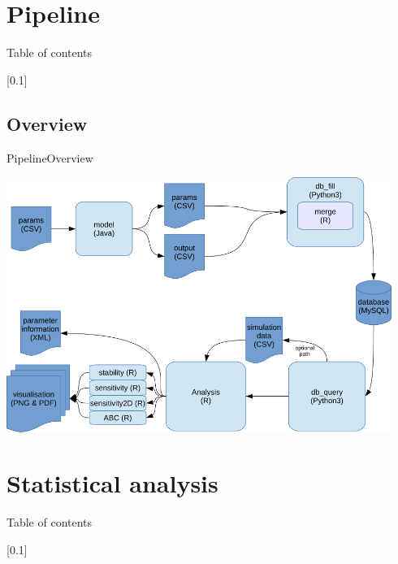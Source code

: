 \documentclass[10pt,aspectratio=43]{beamer}
\begin{document}
\section{Pipeline}
\begin{frame}{}{Table of contents}
\tableofcontents[currentsection, subsectionstyle=show/show/hide]
\end{frame}

[0.1]{}{}{}
\subsection{Overview}
\begin{frame}{Pipeline}{Overview}
\begin{center}
  \includegraphics[width=0.94\textwidth]{../data/workflow-2.png}
\end{center}
\end{frame}


\section{Statistical analysis}
\begin{frame}{}{Table of contents}
\tableofcontents[currentsection, subsectionstyle=show/show/hide]
\end{frame}

[0.1]{}{}{}
\end{document}
